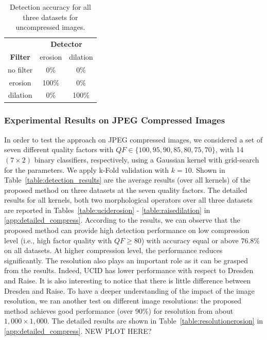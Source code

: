 \documentclass[review]{elsarticle}
\begin{document}
\begin{table}[!ht]
	\centering
	\caption{Detection accuracy for all three datasets for uncompressed images.}
	\label{tab1:det_acc}
	\begin{tabular}{|l|l|l}
		\hline\hline%
		\multicolumn{1}{c|}{}		     & \multicolumn{2}{c}{\textbf{Detector}}	           				    \\ 
		\cline{2-3}
		\multicolumn{1}{c|}{\textbf{Filter}}    & \multicolumn{1}{c|}{erosion} & \multicolumn{1}{c}{dilation} \\ 
		\hline%
		\multicolumn{1}{c|}{no filter} & \multicolumn{1}{c|}{0\%} 	& \multicolumn{1}{c}{0\%}      \\ \hline
		\multicolumn{1}{c|}{erosion}   & \multicolumn{1}{c|}{100\%}   & \multicolumn{1}{c}{0\%}      \\ \hline
		\multicolumn{1}{c|}{dilation}  & \multicolumn{1}{c|}{0\%}     & \multicolumn{1}{c}{100\%}    \\ 
		\hline\hline
	\end{tabular}
\end{table}

\subsubsection{Experimental Results on JPEG Compressed Images}
%
In order to test the approach on JPEG compressed images, we considered a set of seven different quality factors with $QF \in \{100,95,90,85,80,75,70\}$, with 14 $(7\times 2)$ binary classifiers, respectively,
using a Gaussian kernel with grid-search for the parameters. We apply k-Fold validation with $k = 10$. Shown in Table~\ref{table:detection_results} are the average results (over all kernels) of the proposed method on three datasets at the seven quality factors. The detailed results for all kernels, both two morphological operators over all three datasets are reported in Tables~\ref{table:uciderosion} - \ref{table:raisedilation} in \ref{app:detailed_compress}. According to the results, we can observe that the proposed method can provide high detection performance on low compression level (i.e., high factor quality with $QF \ge 80$) with accuracy equal or above $76.8\%$ on all datasets. At higher compression level, the performance reduces significantly. The resolution also plays an important role as it can be grasped from the results. Indeed, UCID has lower performance with respect to Dresden and Raise. It is also interesting to notice that there is little difference between Dresden and Raise. To have a deeper understanding of the impact of the image resolution, we ran another test on different image resolutions: the proposed method achieves good performance (over 90\%) for resolution from about $1,000 \times 1,000$. The detailed results are shown in Table~\ref{table:resolutionerosion} in \ref{app:detailed_compress}. NEW PLOT HERE?
\end{document}
